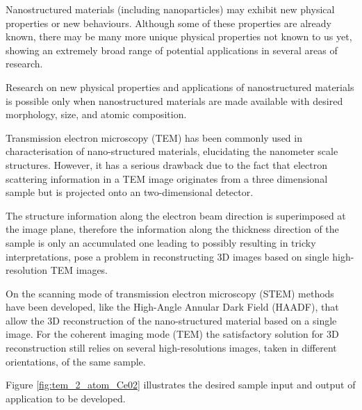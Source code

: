 \documentclass[
  oneside,
  11pt, a4paper,
  footinclude=true,
  headinclude=true,
  cleardoublepage=empty
]{scrbook}
\begin{document}
	
	Nanostructured materials (including nanoparticles) may exhibit new physical properties or new behaviours. Although some of these properties are already known, there may be many more unique physical properties not known to us yet, showing an extremely broad range of potential applications in several areas of research.\par 
	
	Research on new physical properties and applications of nanostructured materials is possible only when nanostructured materials are made available with desired morphology, size, and atomic composition. 
	
	

	
	\par 
    Transmission electron microscopy (TEM) has been commonly used in characterisation
of nano-structured materials, elucidating the nanometer scale structures. 
However, it has a serious drawback due to the fact that electron scattering information in a TEM image originates from a three dimensional
sample but is projected onto an two-dimensional detector.\par 
The structure information along the electron beam direction is superimposed
at the image plane, therefore the information along the thickness direction of the sample is only an accumulated one leading to possibly resulting in tricky interpretations, pose a problem in reconstructing 3D images based on single high-resolution TEM images.\par 


 On the scanning mode of transmission electron microscopy (STEM) methods have been developed, like the High-Angle Annular Dark Field (HAADF), that allow the 3D reconstruction of the nano-structured material based on a single image. For the coherent imaging mode (TEM) the satisfactory solution for 3D reconstruction still relies on several high-resolutions images, taken in different orientations, of the same sample.\par 
 Figure \ref{fig:tem_2_atom_Ce02} illustrates the desired sample input and output of application to be developed.
\end{document}

